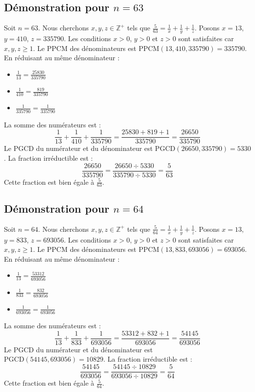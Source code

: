 \documentclass[11pt,a4paper]{article}
\begin{document}
\subsection{Démonstration pour $n = 63$}
Soit $n = 63$. Nous cherchons $x, y, z \in \mathbb{Z}^{+}$ tels que $\frac{5}{63} = \frac{1}{x} + \frac{1}{y} + \frac{1}{z}$.
Posons $x = 13$, $y = 410$, $z = 335790$.
Les conditions $x > 0$, $y > 0$ et $z > 0$ sont satisfaites car $x, y, z \geq 1$.
Le PPCM des dénominateurs est $\text{PPCM}(13, 410, 335790) = 335790$.
En réduisant au même dénominateur :
\begin{itemize}
    \item $\frac{1}{13} = \frac{25830}{335790}$
    \item $\frac{1}{410} = \frac{819}{335790}$
    \item $\frac{1}{335790} = \frac{1}{335790}$
\end{itemize}
La somme des numérateurs est :
$$ \frac{1}{13} + \frac{1}{410} + \frac{1}{335790} = \frac{25830 + 819 + 1}{335790} = \frac{26650}{335790} $$
Le PGCD du numérateur et du dénominateur est $\text{PGCD}(26650, 335790) = 5330$.
La fraction irréductible est :
$$ \frac{26650}{335790} = \frac{26650 \div 5330}{335790 \div 5330} = \frac{5}{63} $$
Cette fraction est bien égale à $\frac{5}{63}$.

\subsection{Démonstration pour $n = 64$}
Soit $n = 64$. Nous cherchons $x, y, z \in \mathbb{Z}^{+}$ tels que $\frac{5}{64} = \frac{1}{x} + \frac{1}{y} + \frac{1}{z}$.
Posons $x = 13$, $y = 833$, $z = 693056$.
Les conditions $x > 0$, $y > 0$ et $z > 0$ sont satisfaites car $x, y, z \geq 1$.
Le PPCM des dénominateurs est $\text{PPCM}(13, 833, 693056) = 693056$.
En réduisant au même dénominateur :
\begin{itemize}
    \item $\frac{1}{13} = \frac{53312}{693056}$
    \item $\frac{1}{833} = \frac{832}{693056}$
    \item $\frac{1}{693056} = \frac{1}{693056}$
\end{itemize}
La somme des numérateurs est :
$$ \frac{1}{13} + \frac{1}{833} + \frac{1}{693056} = \frac{53312 + 832 + 1}{693056} = \frac{54145}{693056} $$
Le PGCD du numérateur et du dénominateur est $\text{PGCD}(54145, 693056) = 10829$.
La fraction irréductible est :
$$ \frac{54145}{693056} = \frac{54145 \div 10829}{693056 \div 10829} = \frac{5}{64} $$
Cette fraction est bien égale à $\frac{5}{64}$.
\end{document}
